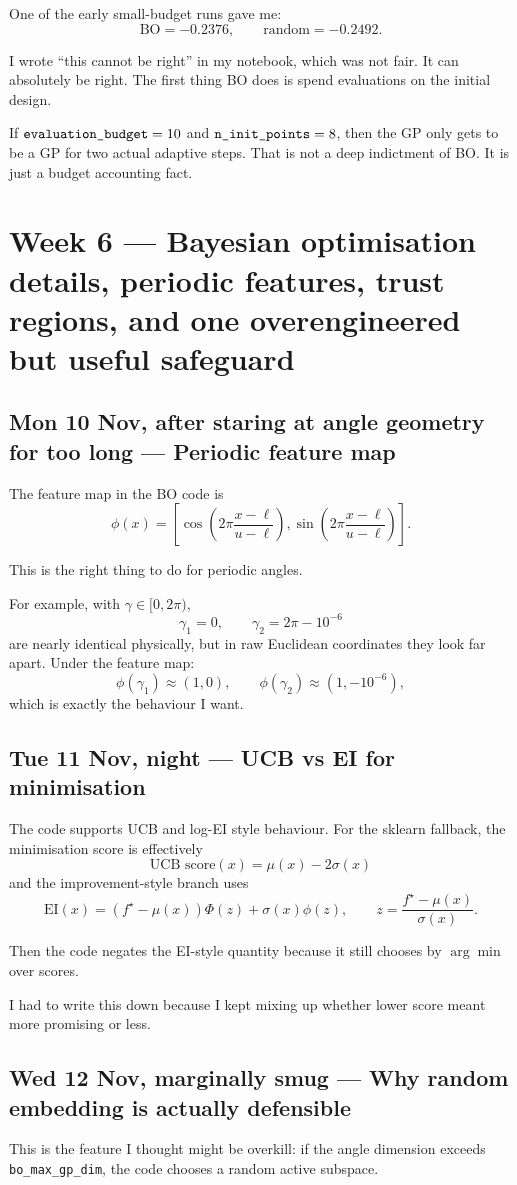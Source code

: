 \documentclass[11pt]{article}
\newcommand{\entry}[2]{\subsection*{#1 --- #2}}
\newcommand{\repo}[1]{\texttt{#1}}
\begin{document}
One of the early small-budget runs gave me:
\[
\text{BO} = -0.2376,
\qquad
\text{random} = -0.2492.
\]

I wrote ``this cannot be right'' in my notebook, which was not fair.
It can absolutely be right. The first thing BO does is spend evaluations on the initial design.

If \(\text{\repo{evaluation\_budget}}=10\) and \(\text{\repo{n\_init\_points}}=8\), then the GP only gets to
be a GP for two actual adaptive steps. That is not a deep indictment of BO. It is just a budget
accounting fact.

\section*{Week 6 --- Bayesian optimisation details, periodic features, trust regions, and one overengineered but useful safeguard}

\entry{Mon 10 Nov, after staring at angle geometry for too long}{Periodic feature map}

The feature map in the BO code is
\[
\phi(x)
=
\left[
\cos\!\left(2\pi\frac{x-\ell}{u-\ell}\right),
\sin\!\left(2\pi\frac{x-\ell}{u-\ell}\right)
\right].
\]

This is the right thing to do for periodic angles.

For example, with \(\gamma \in [0,2\pi)\),
\[
\gamma_1 = 0,
\qquad
\gamma_2 = 2\pi - 10^{-6}
\]
are nearly identical physically, but in raw Euclidean coordinates they look far apart.
Under the feature map:
\[
\phi(\gamma_1) \approx (1,0),
\qquad
\phi(\gamma_2) \approx (1,-10^{-6}),
\]
which is exactly the behaviour I want.

\entry{Tue 11 Nov, night}{UCB vs EI for minimisation}

The code supports UCB and log-EI style behaviour.
For the sklearn fallback, the minimisation score is effectively
\[
\text{UCB score}(x) = \mu(x) - 2\sigma(x)
\]
and the improvement-style branch uses
\[
\text{EI}(x)
=
(f^\star - \mu(x))\Phi(z) + \sigma(x)\phi(z),
\qquad
z = \frac{f^\star - \mu(x)}{\sigma(x)}.
\]

Then the code negates the EI-style quantity because it still chooses by \(\arg\min\) over scores.

I had to write this down because I kept mixing up whether lower score meant more promising or less.

\entry{Wed 12 Nov, marginally smug}{Why random embedding is actually defensible}

This is the feature I thought might be overkill:
if the angle dimension exceeds \repo{bo\_max\_gp\_dim}, the code chooses a random active subspace.
\end{document}
